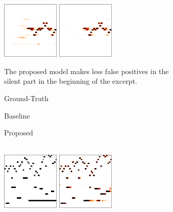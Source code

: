 \begin{figure}
\begin{subfigure}[b]{\textwidth}
		\quad
		\includegraphics[width=0.3\textwidth]{cropped/2298-baseline.png}
		\quad
		\includegraphics[width=0.3\textwidth]{cropped/2298-proposed.png}
		\caption{The proposed model makes less false positives in the silent part in the beginning of the excerpt.}
		\label{}
	\end{subfigure}
	\begin{subfigure}[b]{\textwidth}
		\vspace{2em}
		\centering
		\parbox{0.3\textwidth}{\footnotesize\centering Ground-Truth}
		\quad
		\parbox{0.3\textwidth}{\footnotesize\centering Baseline}
		\quad
		\parbox{0.3\textwidth}{\footnotesize\centering Proposed}
		\\
		\vspace{0.5em}
		\includegraphics[width=0.3\textwidth]{cropped/2303-label.png}
		\quad
		\includegraphics[width=0.3\textwidth]{cropped/2303-baseline.png}
		\quad

\end{subfigure}
\end{figure}
